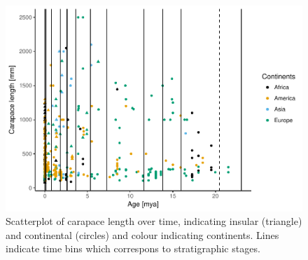 \begin{figure}[htbp]
	\centering
	\includegraphics{MA_JJ_files/figure-latex/overviewData-1.pdf}
	\caption{Scatterplot of carapace length over time, indicating insular (triangle) and
		continental (circles) and colour indicating continents. Lines indicate time
		bins which correspons to stratigraphic stages.}
	\label{fig:bins}
\end{figure}
